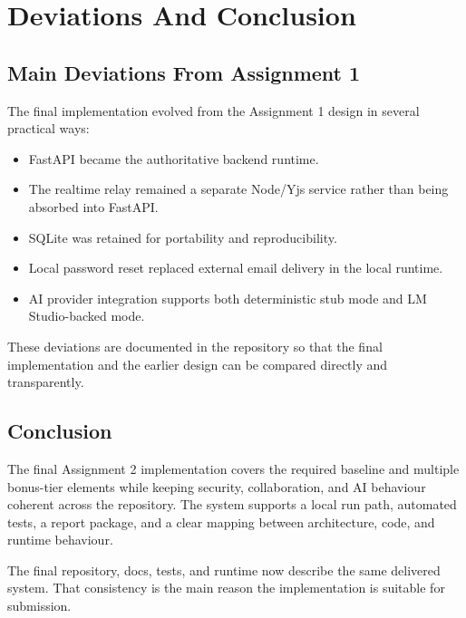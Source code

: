 \chapter{Deviations And Conclusion}

\section{Main Deviations From Assignment 1}

The final implementation evolved from the Assignment 1 design in several practical ways:

\begin{itemize}
  \item FastAPI became the authoritative backend runtime.
  \item The realtime relay remained a separate Node/Yjs service rather than being absorbed into FastAPI.
  \item SQLite was retained for portability and reproducibility.
  \item Local password reset replaced external email delivery in the local runtime.
  \item AI provider integration supports both deterministic stub mode and LM Studio-backed mode.
\end{itemize}

These deviations are documented in the repository so that the final implementation and the earlier design
can be compared directly and transparently.

\section{Conclusion}

The final Assignment 2 implementation covers the required baseline and multiple bonus-tier elements while
keeping security, collaboration, and AI behaviour coherent across the repository. The system supports a
local run path, automated tests, a report package, and a clear mapping between architecture, code, and
runtime behaviour.

The final repository, docs, tests, and runtime now describe the same delivered system. That consistency is
the main reason the implementation is suitable for submission.
